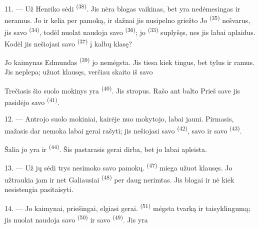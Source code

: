 \VUsaut{4.2mm}
\VUsaut{3.2mm}

11. --- Už Henriko sėdi  \textsuperscript{(38)}. Jis nėra blogas
vaikinas, bet yra  nedėmesingas ir neramus. Jo
 ir  kelia  per
pamoką, ir dažnai jis nusipelno griežto  Jo  \textsuperscript{(35)} nešvarus, jis  savo
 \textsuperscript{(34)}, todėl nuolat naudoja savo 
\textsuperscript{(36)}; jo  \textsuperscript{(33)} suplyšęs, nes jis
labai aplaidus. Kodėl jis nešiojasi savo 
\textsuperscript{(37)} į  kalbų klasę?

Jo kaimynas Edmundas \textsuperscript{(39)} jo nemėgsta. Jis tiesa kiek tingus, bet
tylus ir ramus. Jis neplepa; užuot klausęs, verčiau skaito  iš savo

Trečiasis šio suolo mokinys yra  \textsuperscript{(40)}. Jis
stropus. Rašo ant balto  Prieš save jis pasidėjo savo
 \textsuperscript{(41)}.

12. --- Antrojo suolo mokiniai, kairėje nuo mokytojo, labai jauni. Pirmasis, mažasis
 dar nemoka labai gerai rašyti; jis nešiojasi savo  \textsuperscript{(42)}, savo  ir savo 
\textsuperscript{(43)}.

Šalia jo yra  ir  \textsuperscript{(44)}. Šis
pastarasis gerai dirba, bet jo  labai apleista.

13. --- Už jų sėdi trys  nesimoko savo pamokų.
 \textsuperscript{(47)} miega užuot klausęs. Jo 
užtraukia jam  ir net  Galiausiai
 \textsuperscript{(48)} per daug nerimtas. Jis blogai
 ir nė kiek nesistengia pasitaisyti.

14. --- Jo kaimynai, priešingai, elgiasi gerai. 
\textsuperscript{(51)} mėgsta tvarką ir taisyklingumą; jis nuolat naudoja savo
 \textsuperscript{(50)} ir savo 
\textsuperscript{(49)}. Jis yra 

